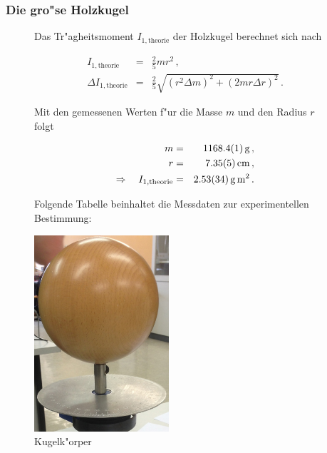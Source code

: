 			\clearpage
			\subsubsection{Die gro"se Holzkugel}
			\label{subsubsec:holzkugel}
				\begin{figure}[htbp]
					
					\begin{minipage}[t]{8cm}
						\vspace{0pt}
						Das Tr"agheitsmoment $I_\mathrm{1, theorie}$ der Holzkugel berechnet sich nach

						\begin{eqnarray*}
							I_\mathrm{1, theorie} & = & \frac{2}{5}mr^2 \,, \\
							\Delta I_\mathrm{1, theorie} & = & \frac{2}{5} \sqrt{ \left(r^2 \Delta m\right)^2 + \left( 2 mr \Delta r\right)^2} \,.
						\end{eqnarray*}

						Mit den gemessenen Werten f"ur die Masse $m$ und den Radius $r$ folgt

						\begin{eqnarray*}
							m & = & \SI{1168.4 (1)}{\gram} \,, \\
							r & = & \SI{7.35 (5)}{\centi \meter} \,, \\
							\Rightarrow \quad I_\mathrm{1, theorie} & = & \SI{2.53 (34)}{\gram \meter \squared} \,.
						\end{eqnarray*}

						Folgende Tabelle beinhaltet die Messdaten zur experimentellen Bestimmung:
					\end{minipage}
					\hfill
					\begin{minipage}[t]{5cm}
						\vspace{0pt}
						\centering
						\includegraphics[width = 5cm]{img/kugel.jpg}
						\caption{Kugelk"orper}
						\label{fig:kugel}
					\end{minipage}
				\end{figure}


